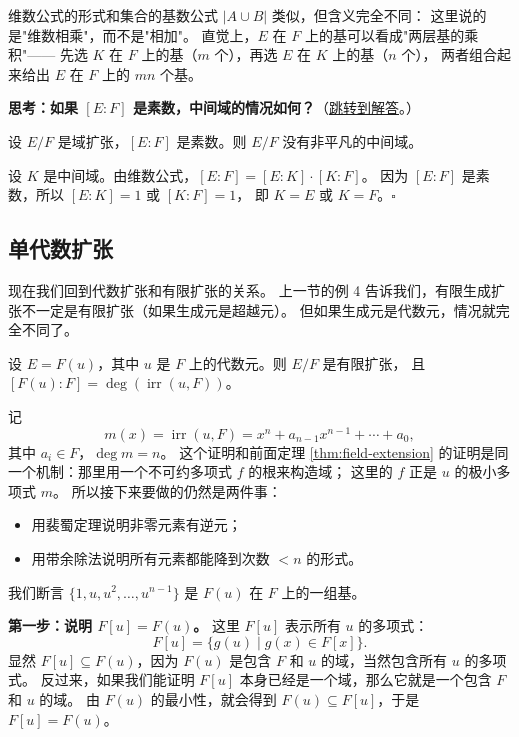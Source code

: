 维数公式的形式和集合的基数公式 $|A \cup B|$ 类似，但含义完全不同：
这里说的是"维数相乘"，而不是"相加"。
直觉上，$E$ 在 $F$ 上的基可以看成"两层基的乘积"——
先选 $K$ 在 $F$ 上的基（$m$ 个），再选 $E$ 在 $K$ 上的基（$n$ 个），
两者组合起来给出 $E$ 在 $F$ 上的 $mn$ 个基。

\hypertarget{q:prime-intermediate}{}
\medskip
\noindent\textbf{思考：如果 $[E:F]$ 是素数，中间域的情况如何？}（\hyperlink{ans:prime-intermediate}{跳转到解答}。）
\medskip

\begin{corollary}[素数次数扩张没有非平凡中间域]\label{cor:prime-no-intermediate}
设 $E/F$ 是域扩张，$[E:F]$ 是素数。则 $E/F$ 没有非平凡的中间域。
\end{corollary}

设 $K$ 是中间域。由维数公式，$[E:F] = [E:K] \cdot [K:F]$。
因为 $[E:F]$ 是素数，所以 $[E:K] = 1$ 或 $[K:F] = 1$，
即 $K = E$ 或 $K = F$。$\square$

\subsection{单代数扩张}

现在我们回到代数扩张和有限扩张的关系。
上一节的例 4 告诉我们，有限生成扩张不一定是有限扩张（如果生成元是超越元）。
但如果生成元是代数元，情况就完全不同了。

\begin{lemma}[单代数扩张是有限扩张]\label{lem:single-algebraic-finite}
设 $E = F(u)$，其中 $u$ 是 $F$ 上的代数元。则 $E/F$ 是有限扩张，
且 $[F(u):F] = \deg(\operatorname{irr}(u, F))$。
\end{lemma}

记
\[
m(x)=\operatorname{irr}(u,F)=x^n+a_{n-1}x^{n-1}+\cdots+a_0,
\]
其中 $a_i\in F$，$\deg m=n$。
这个证明和前面定理 \ref{thm:field-extension} 的证明是同一个机制：那里用一个不可约多项式 $f$ 的根来构造域；
这里的 $f$ 正是 $u$ 的极小多项式 $m$。
所以接下来要做的仍然是两件事：
\begin{itemize}
    \item 用裴蜀定理说明非零元素有逆元；
    \item 用带余除法说明所有元素都能降到次数 $<n$ 的形式。
\end{itemize}

我们断言 $\{1,u,u^2,\ldots,u^{n-1}\}$ 是 $F(u)$ 在 $F$ 上的一组基。

\textbf{第一步：说明 $F[u]=F(u)$。}
这里 $F[u]$ 表示所有 $u$ 的多项式：
\[
F[u]=\{g(u)\mid g(x)\in F[x]\}.
\]
显然 $F[u]\subseteq F(u)$，因为 $F(u)$ 是包含 $F$ 和 $u$ 的域，当然包含所有 $u$ 的多项式。
反过来，如果我们能证明 $F[u]$ 本身已经是一个域，那么它就是一个包含 $F$ 和 $u$ 的域。
由 $F(u)$ 的最小性，就会得到 $F(u)\subseteq F[u]$，于是 $F[u]=F(u)$。

